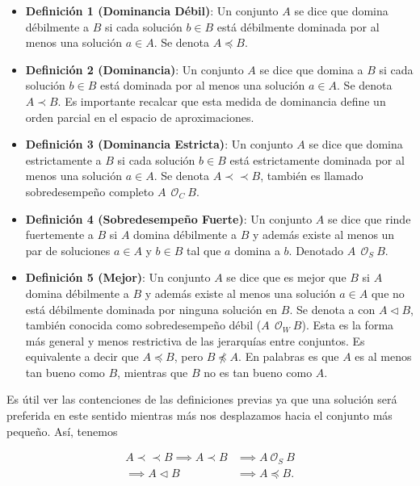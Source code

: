 \begin{itemize}
    \item \textbf{Definición 1 (Dominancia Débil)}: Un conjunto \( A \) se dice que domina débilmente a \( B \) si cada solución \( b \in B \) está débilmente dominada por al menos una solución \( a \in A \). Se denota $ A \preceq B$.
    \item \textbf{Definición 2 (Dominancia)}: Un conjunto \( A \) se dice que domina a \( B \) si cada solución \( b \in B \) está dominada por al menos una solución \( a \in A \). Se denota $A \prec B$. Es importante recalcar que esta medida de dominancia define un orden parcial en el espacio de aproximaciones.
    \item \textbf{Definición 3 (Dominancia Estricta)}: Un conjunto \( A \) se dice que domina estrictamente a \( B \) si cada solución \( b \in B \) está estrictamente dominada por al menos una solución \( a \in A \). Se denota $ A \prec \prec B$, también es llamado sobredesempeño completo $A \ \ \mathcal{O}_C \ B$.
    \item \textbf{Definición 4 (Sobredesempeño Fuerte)}: Un conjunto \( A \) se dice que rinde fuertemente a \( B \) si \( A \) domina débilmente a \( B \) y además existe al menos un par de soluciones \( a \in A \) y \( b \in B \) tal que \( a \) domina a \( b \). Denotado $A \ \ \mathcal{O}_S \ B$.
    \item \textbf{Definición 5 (Mejor)}: Un conjunto \( A \) se dice que es mejor que \( B \) si \( A \) domina débilmente a \( B \) y además existe al menos una solución \( a \in A \) que no está débilmente dominada por ninguna solución en \( B \). Se denota a con $ A \vartriangleleft   B$, también conocida como sobredesempeño débil ($A \ \ \mathcal{O}_W \ B$). Esta es la forma más general y menos restrictiva de las jerarquías entre conjuntos. Es equivalente a decir que $A \preceq B$, pero $B \npreceq A$. En palabras es que $A$ es al menos tan bueno como $B$, mientras que $B$ no es tan bueno como $A$. 
\end{itemize}



Es útil ver las contenciones de las definiciones previas ya que una solución será preferida en este sentido mientras más nos desplazamos hacia el conjunto más pequeño. Así, tenemos 

\begin{align} \label{eq:contencion_comp_sets}
    A \prec \prec B \implies A \prec B &\implies A \ \mathcal{O}_S \ B  \nonumber\\
    \implies A \vartriangleleft B &\implies A\preceq B. \nonumber
\end{align}


